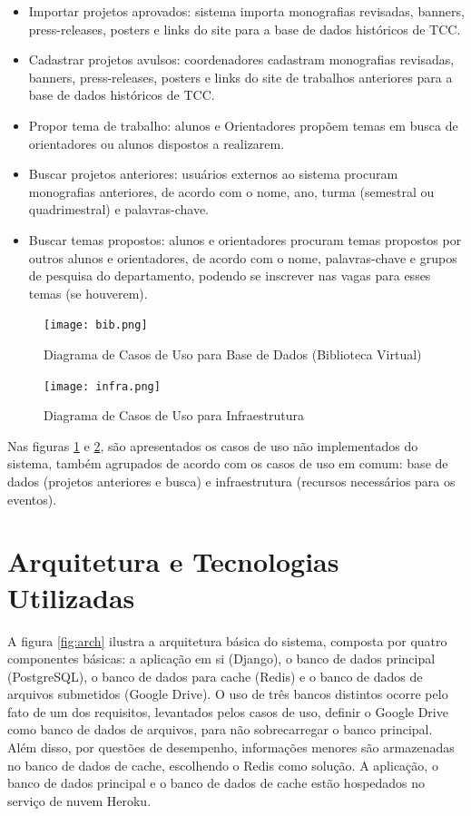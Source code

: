 \begin{itemize}
    \item Importar projetos aprovados: sistema importa monografias revisadas, banners, press-releases, posters e links do site para a base de dados históricos de TCC.
    \item Cadastrar projetos avulsos: coordenadores cadastram monografias revisadas, banners, press-releases, posters e links do site de trabalhos anteriores para a base de dados históricos de TCC.
    \item Propor tema de trabalho: alunos e Orientadores propõem temas em busca de orientadores ou alunos dispostos a realizarem.
    \item Buscar projetos anteriores: usuários externos ao sistema procuram monografias anteriores, de acordo com o nome, ano, turma (semestral ou quadrimestral) e palavras-chave.
    \item Buscar temas propostos: alunos e orientadores procuram temas propostos por outros alunos e orientadores, de acordo com o nome, palavras-chave e grupos de pesquisa do departamento, podendo se inscrever nas vagas para esses temas (se houverem).
\end{itemize}

\begin{figure}[H]
    \centering
    \texttt{[image: bib.png]}
    \caption{Diagrama de Casos de Uso para Base de Dados (Biblioteca Virtual)}
    \label{fig:use-case-bib}
\end{figure}

\begin{figure}[H]
    \centering
    \texttt{[image: infra.png]}
    \caption{Diagrama de Casos de Uso para Infraestrutura}
    \label{fig:use-case-infra}
\end{figure}

Nas figuras \ref{fig:use-case-bib} e \ref{fig:use-case-infra}, são apresentados os casos de uso não implementados do sistema, também agrupados de acordo com os casos de uso em comum: base de dados (projetos anteriores e busca) e infraestrutura (recursos necessários para os eventos). 

\section{Arquitetura e Tecnologias Utilizadas}

A figura \ref{fig:arch} ilustra a arquitetura básica do sistema, composta por quatro componentes básicas: a aplicação em si (Django), o banco de dados principal (PostgreSQL), o banco de dados para cache (Redis) e o banco de dados de arquivos submetidos (Google Drive). O uso de três bancos distintos ocorre pelo fato de um dos requisitos, levantados pelos casos de uso, definir o Google Drive como banco de dados de arquivos, para não sobrecarregar o banco principal. Além disso, por questões de desempenho, informações menores são armazenadas no banco de dados de cache, escolhendo o Redis como solução. A aplicação, o banco de dados principal e o banco de dados de cache estão hospedados no serviço de nuvem Heroku.

